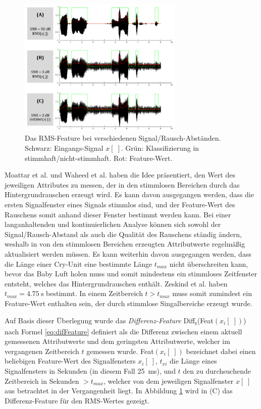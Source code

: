 \begin{figure}[h]
	\centering
	\includegraphics[width=0.7\textwidth]{bilder/rms_diff.png}
	\caption[Das RMS-Feature bei verschiedenen Signal/Rausch-Abständen]{Das RMS-Feature bei verschiedenen Signal/Rausch-Abständen. Schwarz: Eingangs-Signal $x[\;]$. Grün: Klassifizierung in stimmhaft/nicht-stimmhaft. Rot: Feature-Wert.}
	\label{img:min-signal}
\end{figure}

Moattar et al. \cite{vad_Easy} und Waheed et al. \cite{vad_entropy} haben die Idee präsentiert, den Wert des jeweiligen Attributes zu messen, der in den stimmlosen Bereichen durch das Hintergrundrauschen erzeugt wird. Es kann davon ausgegangen werden, dass die ersten Signalfenster eines Signals stimmlos sind, und der Feature-Wert des Rauschens somit anhand dieser Fenster bestimmt werden kann. Bei einer langanhaltenden und kontinuierlichen Analyse können sich sowohl der Signal/Rausch-Abstand als auch die Qualität des Rauschens ständig ändern, weshalb in von den stimmlosen Bereichen erzeugten Attributwerte regelmäßig aktualisiert werden müssen. Es kann weiterhin davon ausgegangen werden, dass die Länge einer Cry-Unit eine bestimmte Länge $t_{max}$ nicht überschreiten kann, bevor das Baby Luft holen muss und somit mindestens ein stimmloses Zeitfenster entsteht, welches das Hintergrundrauschen enthält. Zeskind et al. \cite[S. 325]{rythmic} haben $t_{max} = \SI{4.75}{\second}$ bestimmt. In einem Zeitbereich $ t > t_{max}$ muss somit zumindest ein Feature-Wert enthalten sein, der durch stimmlose Singalbereiche erzeugt wurde. 

Auf Basis dieser Überlegung wurde das \emph{Differenz-Feature} Diff\textsubscript{t}(Feat$(x_i[\;])$) nach Formel \ref{eq:difFeature} definiert als die Differenz zwischen einem aktuell gemessenen Attributwerte und dem geringsten Attributwerte, welcher im vergangenen Zeitbereich $t$ gemessen wurde. Feat$(x_i[\;])$ bezeichnet dabei einen beliebigen Feature-Wert des Signalfensters $x_i[\;]$, $t_{xi}$ die Länge eines Signalfensters in Sekunden (in diesem Fall \SI{25}{\milli\second}), und $t$ den zu durchsuchende Zeitbereich in Sekunden $> t_{max}$, welcher von dem jeweiligen Signalfenster $x[\;]$ aus betrachtet in der Vergangenheit liegt. In Abbildung \ref{img:min-signal} wird in (C) das Differenz-Feature für den RMS-Wertes gezeigt.

